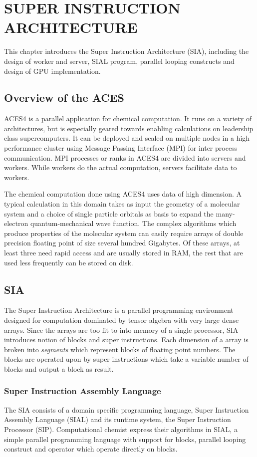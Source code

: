 \chapter{SUPER INSTRUCTION ARCHITECTURE} \label{materials}

This chapter introduces the Super Instruction Architecture (SIA), including the
design of worker and server, SIAL program, parallel looping constructs and
design of GPU implementation.

\section{Overview of the ACES}
ACES4 is a parallel application for chemical computation. It runs on a variety
of architectures, but is especially geared towards enabling calculations on
leadership class supercomputers. It can be deployed and scaled on multiple nodes
in a high performance cluster using Message Passing Interface (MPI) for inter
process communication. MPI processes or ranks in ACES4 are divided into servers
and workers. While workers do the actual computation, servers facilitate data to
workers.

The chemical computation done using ACES4 uses data of high dimension. A typical
calculation in this domain takes as input the geometry of a molecular system and
a choice of single particle orbitals as basis to expand the many-electron
quantum-mechanical wave function. The complex algorithms which produce
properties of the molecular system can easily require arrays of double precision
floating point of size several hundred Gigabytes. Of these arrays, at least
three need rapid access and are usually stored in RAM, the rest that are used
less frequently can be stored on disk.

\section{SIA}
The Super Instruction Architecture is a parallel programming environment
designed for computation dominated by tensor algebra with very large dense
arrays. Since the arrays are too fit to into memory of a single processor, SIA
introduces notion of blocks and super instructions. Each dimension of a array is
broken into \textit{segments} which represent blocks of floating point numbers.
The blocks are operated upon by super instructions which take a variable number
of blocks and output a block as result.

\subsection{Super Instruction Assembly Language}
The SIA consists of a domain specific programming language, Super Instruction
Assembly Language (SIAL) and its runtime system, the Super Instruction Processor
(SIP). Computational chemist express their algorithms in SIAL, a simple parallel
programming language with support for blocks, parallel looping construct and
operator which operate directly on blocks.

